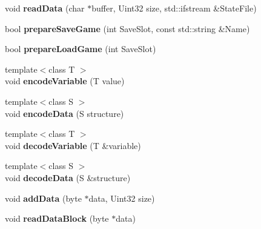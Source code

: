 \begin{DoxyCompactItemize}
\item 
\hypertarget{class_c_saved_game_acd4c2fff042efebaedfdaf6057df5c38}{
void {\bfseries readData} (char $\ast$buffer, Uint32 size, std::ifstream \&StateFile)}
\label{class_c_saved_game_acd4c2fff042efebaedfdaf6057df5c38}

\item 
\hypertarget{class_c_saved_game_a9c16440c0d3c920793ac42b135b58c28}{
bool {\bfseries prepareSaveGame} (int SaveSlot, const std::string \&Name)}
\label{class_c_saved_game_a9c16440c0d3c920793ac42b135b58c28}

\item 
\hypertarget{class_c_saved_game_a2490fac79756b1be3231d3d20697520f}{
bool {\bfseries prepareLoadGame} (int SaveSlot)}
\label{class_c_saved_game_a2490fac79756b1be3231d3d20697520f}

\item 
\hypertarget{class_c_saved_game_a27ab918bf8a80f121e7b8312c2340478}{
{\footnotesize template$<$class T $>$ }\\void {\bfseries encodeVariable} (T value)}
\label{class_c_saved_game_a27ab918bf8a80f121e7b8312c2340478}

\item 
\hypertarget{class_c_saved_game_a808979e8f826b0a21dc0246da2aa27f2}{
{\footnotesize template$<$class S $>$ }\\void {\bfseries encodeData} (S structure)}
\label{class_c_saved_game_a808979e8f826b0a21dc0246da2aa27f2}

\item 
\hypertarget{class_c_saved_game_a91ff6b8b71c6e7850c495d6a2c7380ba}{
{\footnotesize template$<$class T $>$ }\\void {\bfseries decodeVariable} (T \&variable)}
\label{class_c_saved_game_a91ff6b8b71c6e7850c495d6a2c7380ba}

\item 
\hypertarget{class_c_saved_game_a212af03347c78af55121b9ab790632f4}{
{\footnotesize template$<$class S $>$ }\\void {\bfseries decodeData} (S \&structure)}
\label{class_c_saved_game_a212af03347c78af55121b9ab790632f4}

\item 
\hypertarget{class_c_saved_game_a5969dc4363d61ef8d0148fc214c7c86c}{
void {\bfseries addData} (byte $\ast$data, Uint32 size)}
\label{class_c_saved_game_a5969dc4363d61ef8d0148fc214c7c86c}

\item 
\hypertarget{class_c_saved_game_aba21a789d413711bd1f82e2780b0b5e5}{
void {\bfseries readDataBlock} (byte $\ast$data)}
\label{class_c_saved_game_aba21a789d413711bd1f82e2780b0b5e5}


\end{DoxyCompactItemize}
